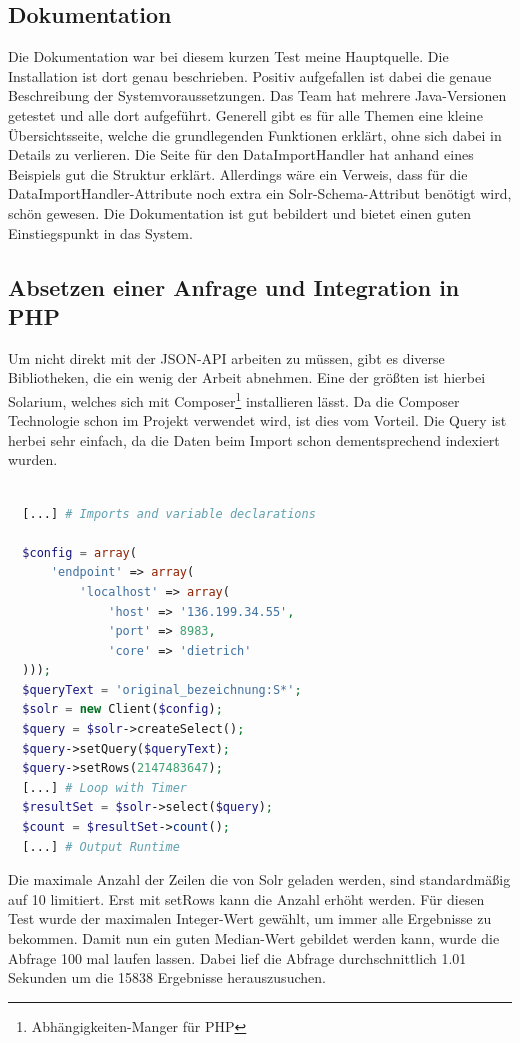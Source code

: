 \subsection{Dokumentation}

Die Dokumentation war bei diesem kurzen Test meine Hauptquelle. Die Installation ist dort genau beschrieben. Positiv aufgefallen ist dabei die genaue Beschreibung der Systemvoraussetzungen. Das Team hat mehrere Java-Versionen getestet und alle dort aufgeführt. 
Generell gibt es für alle Themen eine kleine Übersichtsseite, welche die grundlegenden Funktionen erklärt, ohne sich dabei in Details zu verlieren. 
Die Seite für den DataImportHandler hat anhand eines Beispiels gut die Struktur erklärt. Allerdings wäre ein Verweis, dass für die DataImportHandler-Attribute noch extra ein Solr-Schema-Attribut benötigt wird, schön gewesen.
Die Dokumentation ist gut bebildert und bietet einen guten Einstiegspunkt in das System.

\subsection{Absetzen einer Anfrage und Integration in PHP}

Um nicht direkt mit der JSON-API arbeiten zu müssen, gibt es diverse Bibliotheken, die ein wenig der Arbeit abnehmen. Eine der größten ist hierbei Solarium, welches sich mit Composer\footnote{Abhängigkeiten-Manger für PHP} installieren lässt. Da die Composer Technologie schon im Projekt verwendet wird, ist dies vom Vorteil.
Die Query ist herbei sehr einfach, da die Daten beim Import schon dementsprechend indexiert wurden.

\begin{lstlisting}[language=php, frame=single, label={lst:SolrPhp}, 
  morekeywords={type,uninvertible,indexed,stored,field,multiValued, name}] 

  [...] # Imports and variable declarations

  $config = array(
      'endpoint' => array(
          'localhost' => array(
              'host' => '136.199.34.55',
              'port' => 8983,
              'core' => 'dietrich'
  )));
  $queryText = 'original_bezeichnung:S*';
  $solr = new Client($config);
  $query = $solr->createSelect();
  $query->setQuery($queryText);
  $query->setRows(2147483647); 
  [...] # Loop with Timer
  $resultSet = $solr->select($query);
  $count = $resultSet->count();
  [...] # Output Runtime
\end{lstlisting}

Die maximale Anzahl der Zeilen die von Solr geladen werden, sind standardmäßig auf 10 limitiert. Erst mit setRows kann die Anzahl erhöht werden. Für diesen Test wurde der maximalen Integer-Wert gewählt, um immer alle Ergebnisse zu bekommen. Damit nun ein guten Median-Wert gebildet werden kann, wurde die Abfrage 100 mal laufen lassen. Dabei lief die Abfrage durchschnittlich 1.01 Sekunden um die 15838 Ergebnisse herauszusuchen. 
